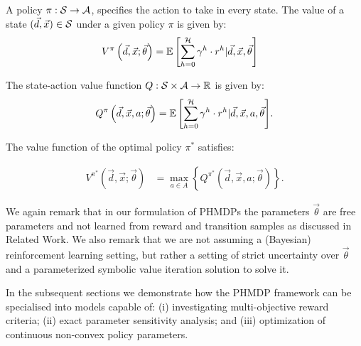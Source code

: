 A policy {\footnotesize $\pi : \mathcal{S} \rightarrow \mathcal{A}$}, specifies
the action to take in every state. The value of a state {\footnotesize
  $(\vec{d}, \vec{x}) \in \mathcal{S}$} under a given policy
{\footnotesize$\pi$} is given by: {\footnotesize
    \abovedisplayskip=0pt
    \belowdisplayskip=0pt
\begin{align*}
    V^{\pi}\left( \vec{d}, \vec{x}; \vec{\theta} \right) &= {\mathbb{E}\left[{\sum\limits_{h = 0}^{\mathcal{H}} \gamma^h \cdot r^h | \vec{d}, \vec{x}, \vec{\theta}}\right]} \nonumber  
\end{align*}
}

The state-action value function {\footnotesize$Q : \mathcal{S} \times \mathcal{A} \rightarrow \mathbb{R}$} is given by:
{\footnotesize 
    \abovedisplayskip=0pt
    \belowdisplayskip=0pt
\begin{align}
    \label{eq:mdp_qfunc}
    Q^{\pi}\left(\vec{d}, \vec{x}, a; \vec{\theta}\right) = {\mathbb{E}\left[{\sum\limits_{h = 0}^{\mathcal{H}} \gamma^h \cdot r^h | \vec{d}, \vec{x}, a, \vec{\theta}}\right]}. 
\end{align}
}

The value function of the optimal policy {\footnotesize$ \pi^{*} $} satisfies:

{\footnotesize 
\abovedisplayskip=0pt
\belowdisplayskip=0pt
\begin{align}
    \label{eq:opt_vfunc}
    V^{\pi^{*}}(\vec{d}, \vec{x}; \vec{\theta}) &= \max_{a \in A} \left\{ Q^{\pi^{*}}(\vec{d}, \vec{x}, a; \vec{\theta}) \right\}. 
\end{align}
}%

We again remark that in our formulation of PHMDPs the
parameters {\footnotesize $ \vec{\theta} $} are free parameters and not
learned from reward and transition samples as discussed in Related Work.
We also remark that we are not assuming a (Bayesian) reinforcement learning setting,
but rather a setting of strict uncertainty over {\footnotesize $ \vec{\theta} $} and
a parameterized symbolic value iteration solution to solve it.

In the subsequent sections we demonstrate how the PHMDP framework can
be specialised into models capable of: (i) investigating
multi-objective reward criteria; (ii) exact parameter sensitivity
analysis; and (iii) optimization of continuous non-convex policy
parameters.

